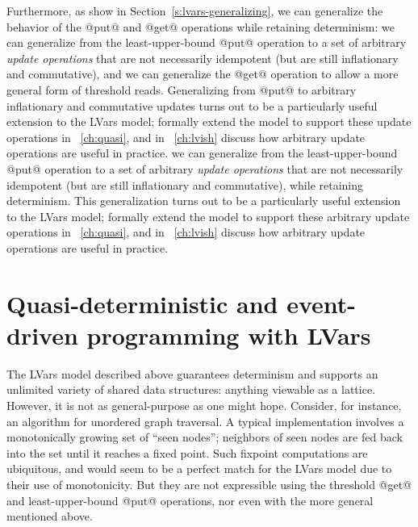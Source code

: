 Furthermore, as  show in
Section~\ref{s:lvars-generalizing}, 
\ifdefined\DISSERTATION
we can generalize the behavior of
the @put@ and @get@ operations while retaining determinism: we can
generalize from the least-upper-bound @put@ operation to a set of
arbitrary \emph{update operations} that are not necessarily idempotent
(but are still inflationary and commutative), and we can generalize
the @get@ operation to allow a more general form of threshold reads.
Generalizing from @put@ to arbitrary inflationary and commutative
updates turns out to be a particularly useful extension to the LVars
model;  formally extend the model to support these update operations
in ~\ref{ch:quasi}, and in ~\ref{ch:lvish}  discuss how
arbitrary update operations are useful in practice.
\fi
\ifdefined\JOURNAL
we can generalize from the least-upper-bound @put@ operation to a set
of arbitrary \emph{update operations} that are not necessarily
idempotent (but are still inflationary and commutative), while
retaining determinism.  This generalization turns out to be a
particularly useful extension to the LVars model; 
formally extend the model to support these arbitrary update operations
in ~\ref{ch:quasi}, and in
~\ref{ch:lvish}  discuss how
arbitrary update operations are useful in practice.
\fi

\section{Quasi-deterministic and event-driven programming with LVars}\label{s:intro-quasi}

The LVars model described above guarantees determinism and supports an
unlimited variety of shared data structures: anything viewable as a
lattice.  However, it is not as general-purpose as one might hope.
Consider, for instance, an algorithm for unordered graph traversal.  A
typical implementation involves a monotonically growing set of ``seen
nodes''; neighbors of seen nodes are fed back into the set until it
reaches a fixed point.  Such fixpoint computations are ubiquitous, and
would seem to be a perfect match for the LVars model due to their use
of monotonicity.  But they are not expressible using the threshold
@get@ and least-upper-bound @put@ operations, nor even with the more
general  mentioned above.

